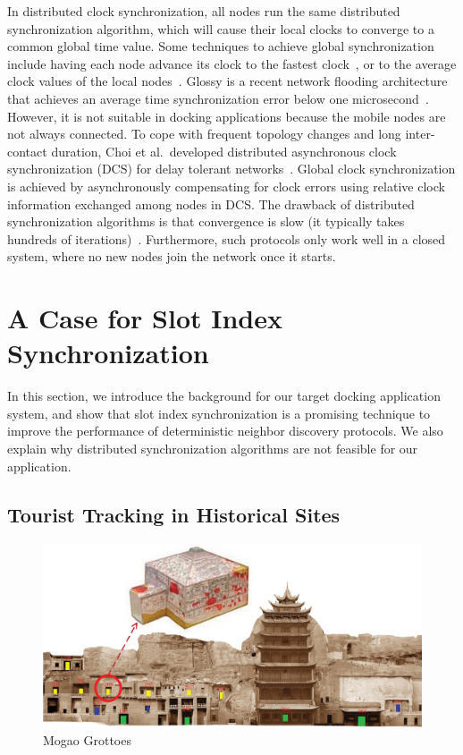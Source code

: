 \documentclass[twoside,twocolumn]{article}
\begin{document}
In distributed clock synchronization, all nodes run the same distributed synchronization algorithm, which 
will cause their local clocks to converge to a common global time value.  Some techniques to achieve global 
synchronization include having each node advance its clock to the fastest clock~\citep{jiang2004clock,zhou2007accurate}, 
or to the average clock values of the local nodes~\citep{li2006global,sommer2009gradient,sasabe2009simple}.  
Glossy is a recent network flooding architecture that achieves an average time synchronization error below 
one microsecond~\citep{ferrari11glossy}.  However, it is not suitable in docking applications because the 
mobile nodes are not always connected.  To cope with frequent topology changes and long inter-contact duration, 
Choi et al.\ developed distributed asynchronous clock synchronization (DCS) for delay tolerant networks~\citep{choi2012dcs}.  
Global clock synchronization is achieved by asynchronously compensating for clock errors using relative clock
information exchanged among nodes in DCS. The drawback of distributed synchronization algorithms is that 
convergence is slow (it typically takes hundreds of iterations)~\citep{he12random}. Furthermore, such
protocols only work well in a closed system, where no new nodes join the network once it starts.

\section{A Case for Slot Index Synchronization}
\label{sec:challenge}
In this section, we introduce the background for our target docking application system, 
and show that slot index synchronization is a promising technique to improve the 
performance of deterministic neighbor discovery protocols. We also explain why distributed
synchronization algorithms are not feasible for our application.

\subsection{Tourist Tracking in Historical Sites}

\begin{figure}[t]
  \centering 
  \includegraphics[scale=0.35]{static/mogao}
  \caption{Mogao Grottoes}
  \label{fig:mogao}
\end{figure}
\end{document}
